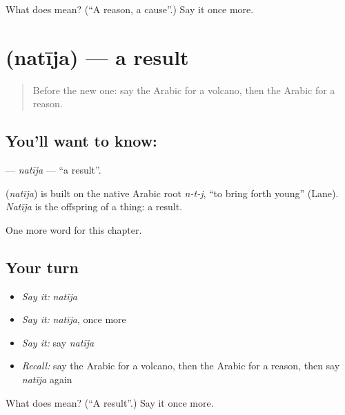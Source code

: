 \begin{tcolorbox}[breakable,colback=teal!4,colframe=teal!35!black,title={Before you move on}]
What does  mean? (\textquotedblleft{}A reason, a cause\textquotedblright{}.) Say it once more.
\end{tcolorbox}
\section[\texorpdfstring{\ar{نتيجة} (natīja)}{نتيجة (natīja)}]{ (natīja) — a result}

\label{lesson:AR-C174-natija}



\begin{quote}
Before the new one: say the Arabic for a volcano, then the Arabic for a reason.
\end{quote}

\subsection*{You'll want to know: }
\textbf{} — \emph{natīja} — \textquotedblleft{}a result\textquotedblright{}.

\begin{cousinweb}
\textbf{} (\emph{natīja}) is built on the native Arabic root \emph{n-t-j}, \textquotedblleft{}to bring forth young\textquotedblright{} (Lane). \emph{Natīja} is the offspring of a thing: a result.
\end{cousinweb}

\begin{grammarlens}[title={What you've built}]
One more word for this chapter.
\end{grammarlens}

\subsection*{Your turn}
\begin{itemize}
\raggedright
  \item \emph{Say it:} \emph{natīja}
  \item \emph{Say it:} \emph{natīja}, once more
  \item \emph{Say it:} say \emph{natīja}
  \item \emph{Recall:} say the Arabic for a volcano, then the Arabic for a reason, then say \emph{natīja} again
\end{itemize}

\begin{tcolorbox}[breakable,colback=teal!4,colframe=teal!35!black,title={Before you move on}]
What does  mean? (\textquotedblleft{}A result\textquotedblright{}.) Say it once more.
\end{tcolorbox}
